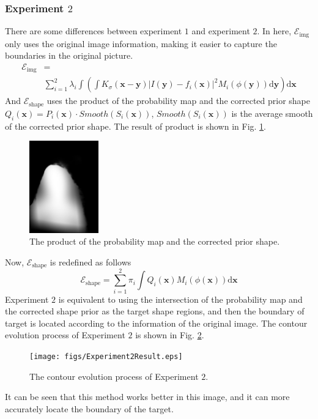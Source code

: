 \subsubsection{Experiment $2$}
There are some differences between experiment $1$ and experiment $2$. In here, $\mathcal{E}_{\text{img}}$ only uses the original image information, making it easier to capture the boundaries in the original picture.
\begin{equation*}
\begin{split}
    \mathcal{E}_{\text{img}} & = \\
    & \sum_{i=1}^2 \lambda_i\int \left( \int K_\sigma(\mathbf{x}-\mathbf{y}) \left| I(\mathbf{y}) - f_i(\mathbf{x}) \right|^2 M_i(\phi(\mathbf{y}))\mathrm{d}\mathbf{y} \right)\mathrm{d}\mathbf{x}
\end{split}
\end{equation*}
And $\mathcal{E}_{\text{shape}}$ uses the product of the probability map and the corrected prior shape $Q_i(\mathbf{x}) = P_i(\mathbf{x})\cdot Smooth(S_i(\mathbf{x}))$, $Smooth(S_i(\mathbf{x}))$ is the average smooth of the corrected prior shape. The result of product is shown in Fig. \ref{fig: The product of the probability map and the corrected prior shape}.
\begin{figure}[h]
    \centering
    \includegraphics[width=3cm]{figs/Experiment2_plus.jpg}
    \caption{The product of the probability map and the corrected prior shape.}
    \label{fig: The product of the probability map and the corrected prior shape}
\end{figure}
Now, $\mathcal{E}_{\text{shape}}$ is redefined as follows
\begin{equation*}
    \mathcal{E}_{\text{shape}} = \sum_{i=1}^2 \pi_i \int Q_i(\mathbf{x}) M_i(\phi(\mathbf{x})) \mathrm{d}\mathbf{x}
\end{equation*}
Experiment $2$ is equivalent to using the intersection of the probability map and the corrected shape prior as the target shape regions, and then the boundary of target is located according to the information of the original image. The contour evolution process of Experiment $2$ is shown in Fig. \ref{fig: The contour evolution process of Experiment 2}.
\begin{figure}[h]
    \centering
    \texttt{[image: figs/Experiment2Result.eps]}
    \caption{The contour evolution process of Experiment $2$.}
    \label{fig: The contour evolution process of Experiment 2}
\end{figure}
It can be seen that this method works better in this image, and it can more accurately locate the boundary of the target.
